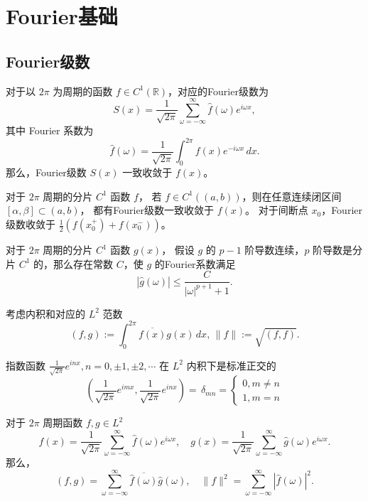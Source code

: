 \chapter{Fourier基础}

\section{Fourier级数}

\begin{theorem}
    对于以 $2\pi$ 为周期的函数 $f \in C^1(\mathbb{R})$，对应的Fourier级数为
    \[
        S(x) = \frac{1}{\sqrt{2\pi}} \sum_{\omega = -\infty}^\infty \hat{f}(\omega) e^{i \omega x},
    \]
    其中 Fourier 系数为
    \[
        \hat{f}(\omega) = \frac{1}{\sqrt{2\pi}} \int_{0}^{2\pi} f(x)e^{-i \omega x} \,dx.
    \]
    那么，Fourier级数 $S(x)$ 一致收敛于 $f(x)$。
\end{theorem}


\begin{theorem}
    对于 $2\pi$ 周期的分片 $C^1$ 函数 $f$，
    若 $f \in C^1((a,b))$，则在任意连续闭区间 $[\alpha,\beta] \subset (a,b)$，
    都有Fourier级数一致收敛于 $f(x)$。
    对于间断点 $x_0$，Fourier 级数收敛于 $\frac12(f(x_0^+) + f(x_0^-))$。
\end{theorem}



\begin{theorem}
    对于 $2\pi$ 周期的分片 $C^1$ 函数 $g(x)$，
    假设 $g$ 的 $p-1$ 阶导数连续，$p$ 阶导数是分片 $C^1$ 的，那么存在常数 $C$，使 $g$ 的Fourier系数满足
    \[
        |\hat{g}(\omega)| \le \frac{C}{|\omega|^{p+1}+1}.
    \]
\end{theorem}

考虑内积和对应的 $L^2$ 范数
\[
    (f,g) := \int_0^{2\pi} \overline{f(x)}g(x)\,dx,\,\|f\| := \sqrt{(f,f)}.
\]


\begin{lemma}
    指数函数 $\frac{1}{\sqrt{2\pi}} e^{i n x},n=0,\pm 1,\pm 2,\cdots$
    在 $L^2$ 内积下是标准正交的
    \[
        \left(\frac{1}{\sqrt{2\pi}} e^{i m x},\frac{1}{\sqrt{2\pi}} e^{i n x}\right)
        =\, \delta_{mn} =  \left\{
        \begin{aligned}
            0, m \neq n \\
            1, m = n
        \end{aligned}
        \right.\]
\end{lemma}


\begin{theorem}[Parseval 关系]
    对于 $2\pi$ 周期函数 $f,g \in L^2$
    \[
        f(x) = \frac{1}{\sqrt{2\pi}} \sum_{\omega = -\infty}^\infty \hat{f}(\omega) e^{i \omega x},\quad
        g(x) = \frac{1}{\sqrt{2\pi}} \sum_{\omega = -\infty}^\infty \hat{g}(\omega) e^{i \omega x}.
    \]
    那么，
    \[
        (f,g) = \sum_{\omega = -\infty}^\infty \overline{\hat{f}(\omega)} \hat{g}(\omega),\quad
        \|f\|^2 = \sum_{\omega = -\infty}^\infty |\hat{f}(\omega)|^2.
    \]
\end{theorem}




